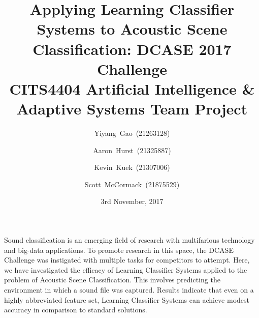 \documentclass[11pt]{article}
\renewenvironment{abstract}
{\small
	\begin{center}
		\bfseries \abstractname\vspace{-.5em}\vspace{0pt}
	\end{center}
	\list{}{
		\setlength{\leftmargin}{.5cm}%
		\setlength{\rightmargin}{\leftmargin}%
	}%
	\item\relax}
{\endlist}
\begin{document}
\title{
	Applying Learning Classifier Systems to Acoustic Scene Classification: DCASE 2017 Challenge \\
	\vspace{0.2in}
	\large CITS4404 Artificial Intelligence \& Adaptive Systems Team Project
}
\author{Yiyang~Gao~(21263128)}
\author{Aaron~Hurst~(21325887)}
\author{Kevin~Kuek~(21307006)}
\author{Scott~McCormack~(21875529)}

\date{3rd November, 2017}

\maketitle

\begin{abstract}
	Sound classification is an emerging field of research with multifarious technology and big-data applications. To promote research in this space, the DCASE Challenge was instigated with multiple tasks for competitors to attempt. Here, we have investigated the efficacy of Learning Classifier Systems applied to the problem of Acoustic Scene Classification. This involves predicting the environment in which a sound file was captured. Results indicate that even on a highly abbreviated feature set, Learning Classifier Systems can achieve modest accuracy in comparison to standard solutions.
	\\
\end{abstract}
\end{document}

